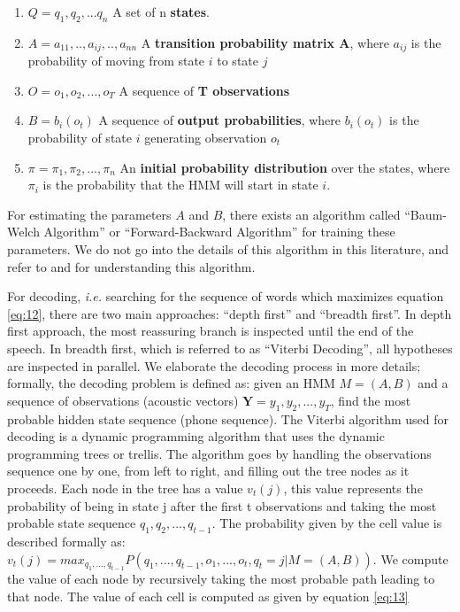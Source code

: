    \begin{enumerate}
   	\item $Q=q_1,q_2,...q_n$ \quad \quad \quad \quad A set of n \textbf{states}.
   	\item $A=a_{11},..,a_{ij},..,a_{nn}$ \quad \quad A \textbf{transition probability matrix A}, where $a_{ij}$ is the probability of moving from state $i$ to state $j$
   	\item $O=o_1,o_2,...,o_T$ \quad \quad \quad \quad A sequence of \textbf{T observations}
   	\item $B=b_i(o_t)$ \quad \quad \quad \quad \quad \quad \quad A sequence of \textbf{output probabilities}, where $b_i(o_t)$ is the probability of state $i$ generating observation $o_t$
   	\item $\pi = \pi_1,\pi_2,...,\pi_n$ \quad \quad \quad \quad An \textbf{initial probability distribution} over the states, where $\pi_i$ is the probability that the \ac{HMM} will start in state $i$.
   	 \cite{keselj2009speech} \cite{rabiner1989tutorial}
   	 
   \end{enumerate}


For estimating the parameters $A$ and $B$, there exists an algorithm called \enquote{Baum-Welch Algorithm} or \enquote{Forward-Backward Algorithm} for training these parameters. We do not go into the details of this algorithm in this literature, and refer to \cite{keselj2009speech} and \cite{baum1972inequality} for understanding this algorithm. 

For decoding, \textit{i.e.} searching for the sequence of words which maximizes equation \ref{eq:12}, there are two main approaches: \enquote{depth first} and \enquote{breadth first}. In depth first approach, the most reassuring branch is inspected until the end of the speech. In breadth first, which is referred to as \enquote{Viterbi Decoding}, all hypotheses are inspected in parallel. We elaborate the decoding process in more details; formally, the decoding problem is defined as: given an \ac{HMM} $M=(A,B)$ and a sequence of observations (acoustic vectors) $\mathbf{Y} = y_1,y_2,...,y_T$, find the most probable hidden state sequence (phone sequence). The Viterbi algorithm used for decoding is a dynamic programming algorithm that uses the dynamic programming trees or trellis. The algorithm goes by handling the observations sequence one by one, from left to right, and filling out the tree nodes as it proceeds. Each node in the tree has a value $v_t(j)$, this value represents the probability of being in state j after the first t observations and taking the most probable state sequence $q_1,q_2,...,q_{t-1}$. The probability given by the cell value is described formally as: $v_t(j) = max_{q_1,...,q_{t-1}} P(q_1,...,q_{t-1},o_1,...,o_t,q_t=j|M=(A,B))$. We compute the value of each node by recursively taking the most probable path leading to that node. The value of each cell is computed as given by equation \ref{eq:13}

